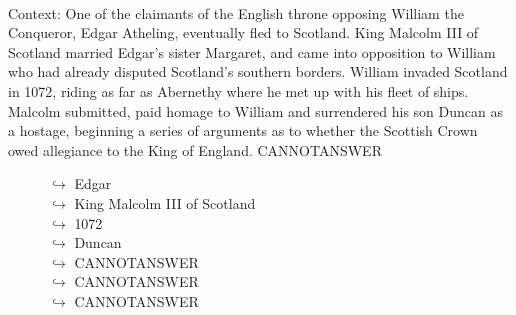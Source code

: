 \documentclass[11pt,a4paper, onecolumn]{article}
\begin{document}
\\ Context: One of the claimants of the English throne opposing William the Conqueror, Edgar Atheling, eventually fled to Scotland. King Malcolm III of Scotland married Edgar's sister Margaret, and came into opposition to William who had already disputed Scotland's southern borders. William invaded Scotland in 1072, riding as far as Abernethy where he met up with his fleet of ships. Malcolm submitted, paid homage to William and surrendered his son Duncan as a hostage, beginning a series of arguments as to whether the Scottish Crown owed allegiance to the King of England. CANNOTANSWER

\begin{figure}[t] \small \begin{tcolorbox}[boxsep=0pt,left=5pt,right=0pt,top=2pt,colback = yellow!5] \begin{dialogue}
 \small 
\colorbox{pink!25}{$\hookrightarrow$}
{ Edgar }
\\
\colorbox{pink!25}{$\hookrightarrow$}
{ King Malcolm III of Scotland }
\\
\colorbox{pink!25}{$\hookrightarrow$}
{ 1072 }
\\
\colorbox{pink!25}{$\hookrightarrow$}
{ Duncan }
\\
\colorbox{pink!25}{$\hookrightarrow$}
{ CANNOTANSWER }
\\
\colorbox{pink!25}{$\hookrightarrow$}
{ CANNOTANSWER }
\\
\colorbox{pink!25}{$\hookrightarrow$}
{ CANNOTANSWER }
\\
 \end{dialogue}\end{tcolorbox}\end{figure}
\end{document}
